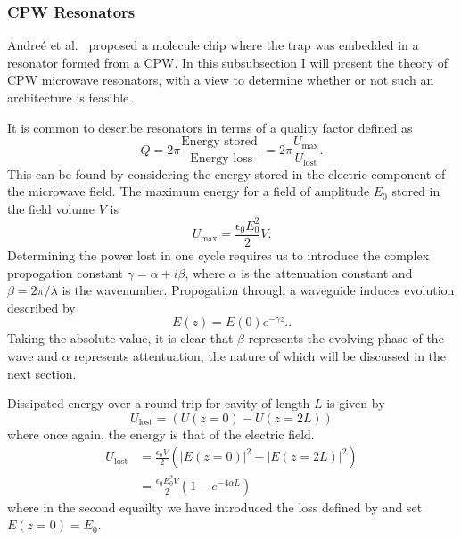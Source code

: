 \subsubsection{CPW Resonators}

Andre\'e et al.~\cite{Andre2006} proposed a molecule chip where the trap was
embedded in a resonator formed from a CPW. In this subsubsection I will present
the theory of CPW microwave resonators, with a view to determine whether or not
such an architecture is feasible.

It is common to describe resonators in terms of a quality
factor defined as~\cite{Jackson1975, 1125652} 
\begin{equation}
  Q = 2\pi \frac{\text{Energy stored }}{\text{Energy loss}} =
  2\pi\frac{U_\mathrm{max}}{U_\mathrm{lost}}.
  \label{experiment:mw:eqn:Qdef}
\end{equation}
This can be found by considering the energy stored in the electric component of
the microwave field. The maximum energy for a field of amplitude $E_0$ stored in
the field volume $V$ is
\begin{equation}
  U_\mathrm{max} = \frac{\epsilon_0E_0^2}{2}V.
  \label{experiment:mw:eqn:Umax}
\end{equation}
Determining the power lost in one cycle requires us to introduce the complex
propogation constant $\gamma = \alpha + i\beta$, where $\alpha$ is the
attenuation constant and $\beta = 2\pi / \lambda$ is the wavenumber. Propogation
through a waveguide induces evolution described by~
\begin{equation}
  E(z) = E(0)e^{-\gamma z}.
  \label{experiment:mw:eqn:Eloss}.
\end{equation}
Taking the absolute value, it is clear that $\beta$ represents the evolving
phase of the wave and $\alpha$ represents attentuation, the nature of which will
be discussed in the next section.

Dissipated energy over a round trip for cavity of length $L$ is given by
\begin{equation}
  U_\mathrm{lost} = \left(U(z=0) - U(z=2L)\right)
\end{equation}
where once again, the energy is that of the electric field.
\begin{align}
  U_\mathrm{lost} &= \frac{\epsilon_0 V}{2}\left( \left|E(z=0)\right|^2 -
  \left|E(z=2L)\right|^2 \right) \\
    &= \frac{\epsilon_0 E_0^2 V}{2}\left(1 - e^{-4\alpha L}\right)
  \label{experiment:mw:eqn:Ulost}
\end{align}
where in the second equailty we have introduced the loss defined by
 and set $E(z=0)=E_0$.

